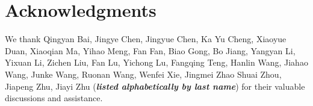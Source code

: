 \section*{Acknowledgments}
We thank 
Qingyan Bai,
Jingye Chen,
Jingyue Chen,
Ka Yu Cheng,
Xiaoyue Duan,
Xiaoqian Ma,
Yihao Meng,
Fan Fan,
Biao Gong,
Bo Jiang,
Yangyan Li,
Yixuan Li,
Zichen Liu,
Fan Lu,
Yichong Lu,
Fangqing Teng,
Hanlin Wang,
Jiahao Wang,
Junke Wang,
Ruonan Wang,
Wenfei Xie,
Jingmei Zhao
Shuai Zhou,
Jiapeng Zhu,
Jiayi Zhu
(\textbf{\textit{listed alphabetically by last name}}) for their valuable discussions and assistance.
